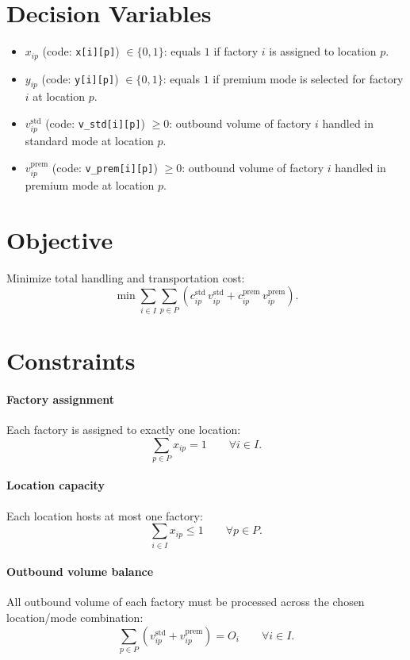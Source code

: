 \section*{Decision Variables}

\begin{itemize}
    \item $x_{ip}$ (code: \texttt{x[i][p]}) $\in \{0,1\}$: equals $1$ if factory $i$ is assigned to location $p$.
    \item $y_{ip}$ (code: \texttt{y[i][p]}) $\in \{0,1\}$: equals $1$ if premium mode is selected for factory $i$ at location $p$.
    \item $v^{\mathrm{std}}_{ip}$ (code: \texttt{v\_std[i][p]}) $\ge 0$: outbound volume of factory $i$ handled in standard mode at location $p$.
    \item $v^{\mathrm{prem}}_{ip}$ (code: \texttt{v\_prem[i][p]}) $\ge 0$: outbound volume of factory $i$ handled in premium mode at location $p$.
\end{itemize}

\section*{Objective}

Minimize total handling and transportation cost:
\[
\min \sum_{i \in I}\sum_{p \in P}
\left(
c^{\mathrm{std}}_{ip}\, v^{\mathrm{std}}_{ip}
+
c^{\mathrm{prem}}_{ip}\, v^{\mathrm{prem}}_{ip}
\right).
\]

\section*{Constraints}

\paragraph{Factory assignment}
Each factory is assigned to exactly one location:
\[
\sum_{p \in P} x_{ip} = 1
\qquad \forall i \in I.
\]

\paragraph{Location capacity}
Each location hosts at most one factory:
\[
\sum_{i \in I} x_{ip} \le 1
\qquad \forall p \in P.
\]

\paragraph{Outbound volume balance}
All outbound volume of each factory must be processed across the chosen location/mode combination:
\[
\sum_{p \in P} \left(v^{\mathrm{std}}_{ip} + v^{\mathrm{prem}}_{ip}\right) = O_i
\qquad \forall i \in I.
\]

